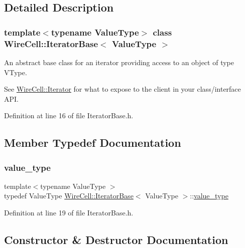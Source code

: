 \subsection{Detailed Description}
\subsubsection*{template$<$typename Value\+Type$>$\newline
class Wire\+Cell\+::\+Iterator\+Base$<$ Value\+Type $>$}

An abstract base class for an iterator providing access to an object of type V\+Type.

See \hyperlink{class_wire_cell_1_1_iterator}{Wire\+Cell\+::\+Iterator} for what to expose to the client in your class/interface A\+PI. 

Definition at line 16 of file Iterator\+Base.\+h.



\subsection{Member Typedef Documentation}
\mbox{\label{class_wire_cell_1_1_iterator_base_af263e640de56fa27ae9eed3cddd7a9e0}} 
\subsubsection{\texorpdfstring{value\+\_\+type}{value\_type}}
{\footnotesize\ttfamily template$<$typename Value\+Type $>$ \\
typedef Value\+Type \hyperlink{class_wire_cell_1_1_iterator_base}{Wire\+Cell\+::\+Iterator\+Base}$<$ Value\+Type $>$\+::\hyperlink{class_wire_cell_1_1_iterator_base_af263e640de56fa27ae9eed3cddd7a9e0}{value\+\_\+type}}



Definition at line 19 of file Iterator\+Base.\+h.



\subsection{Constructor \& Destructor Documentation}
\mbox{\label{class_wire_cell_1_1_iterator_base_ae1705c915b813d46644cfeb09c94b505}} 

